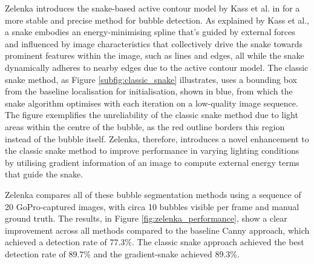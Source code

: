 Zelenka introduces the snake-based active contour model by Kass et al. in \cite{kassSnakesActiveContour1988} for a more stable and precise method for bubble detection. As explained by Kass et al., a snake embodies an energy-minimising spline that's guided by external forces and influenced by image characteristics that collectively drive the snake towards prominent features within the image, such as lines and edges, all while the snake dynamically adheres to nearby edges due to the active contour model. The classic snake method, as Figure \ref{subfig:classic_snake} illustrates, uses a bounding box from the baseline localisation for initialisation, shown in blue, from which the snake algorithm optimises with each iteration on a low-quality image sequence. The figure exemplifies the unreliability of the classic snake method due to light areas within the centre of the bubble, as the red outline borders this region instead of the bubble itself. Zelenka, therefore, introduces a novel enhancement to the classic snake method to improve performance in varying lighting conditions by utilising gradient information of an image to compute external energy terms that guide the snake.

Zelenka compares all of these bubble segmentation methods using a sequence of 20 GoPro-captured images, with circa 10 bubbles visible per frame and manual ground truth. The results, in Figure \ref{fig:zelenka_performance}, show a clear improvement across all methods compared to the baseline Canny approach, which achieved a detection rate of 77.3\%. The classic snake approach achieved the best detection rate of 89.7\% and the gradient-snake achieved 89.3\%.

